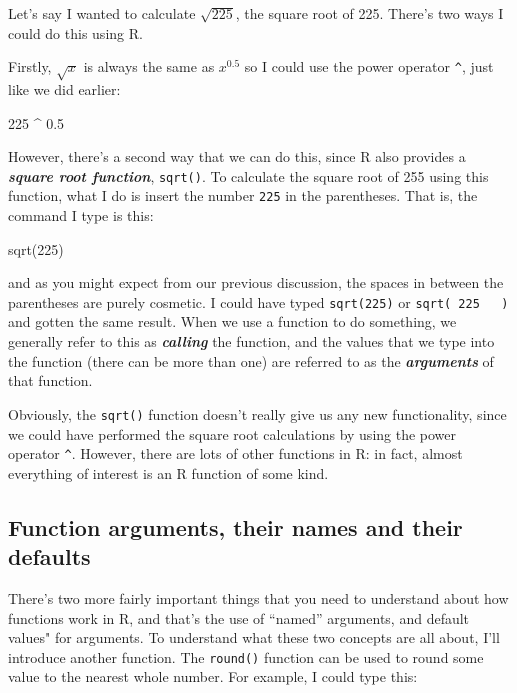 \documentclass[
]{book}
\newenvironment{Shaded}{\begin{snugshade}}{\end{snugshade}}
\newcommand{\DecValTok}[1]{\textcolor[rgb]{0.00,0.00,0.81}{#1}}
\newcommand{\FloatTok}[1]{\textcolor[rgb]{0.00,0.00,0.81}{#1}}
\newcommand{\FunctionTok}[1]{\textcolor[rgb]{0.00,0.00,0.00}{#1}}
\newcommand{\NormalTok}[1]{#1}
\newcommand{\SpecialCharTok}[1]{\textcolor[rgb]{0.00,0.00,0.00}{#1}}
\begin{document}
Let's say I wanted to calculate \(\sqrt{225}\), the square root of 225. There's two ways I could do this using R.

Firstly, \(\sqrt{x}\) is always the same as \({x}^{0.5}\) so I could use the power operator \texttt{\^{}}, just like we did earlier:

\begin{Shaded}
\begin{Highlighting}[]
\DecValTok{225} \SpecialCharTok{\^{}} \FloatTok{0.5}
\end{Highlighting}
\end{Shaded}

However, there's a second way that we can do this, since R also provides a \textbf{\emph{square root function}}, \texttt{sqrt()}. To calculate the square root of 255 using this function, what I do is insert the number \texttt{225} in the parentheses. That is, the command I type is this:

\begin{Shaded}
\begin{Highlighting}[]
\FunctionTok{sqrt}\NormalTok{(}\DecValTok{225}\NormalTok{)}
\end{Highlighting}
\end{Shaded}

and as you might expect from our previous discussion, the spaces in between the parentheses are purely cosmetic. I could have typed \texttt{sqrt(225)} or \texttt{sqrt(\ 225\ \ \ )} and gotten the same result. When we use a function to do something, we generally refer to this as \textbf{\emph{calling}} the function, and the values that we type into the function (there can be more than one) are referred to as the \textbf{\emph{arguments}} of that function.

Obviously, the \texttt{sqrt()} function doesn't really give us any new functionality, since we could have performed the square root calculations by using the power operator \texttt{\^{}}. However, there are lots of other functions in R: in fact, almost everything of interest is an R function of some kind.

\hypertarget{functionarguments}{%
\subsection{Function arguments, their names and their defaults}\label{functionarguments}}

There's two more fairly important things that you need to understand about how functions work in R, and that's the use of ``named'' arguments, and default values" for arguments.
To understand what these two concepts are all about, I'll introduce another function. The \texttt{round()} function can be used to round some value to the nearest whole number. For example, I could type this:
\end{document}
